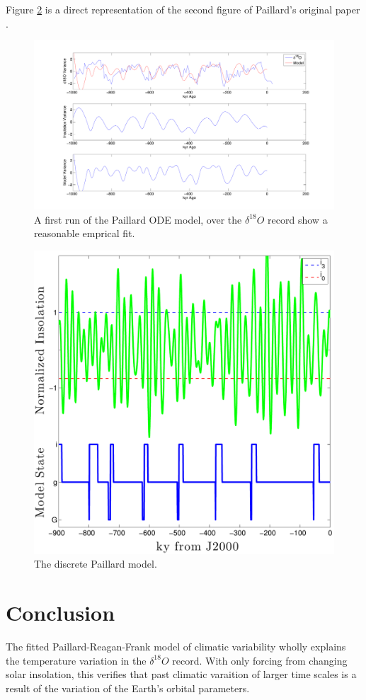 Figure \ref{fig:paillard-fig3} is a direct representation of the second figure of Paillard's original paper \cite{paillard1998timing}.

\begin{figure}[tpb!]
\centering
  \includegraphics[width=.53\textwidth]{paillardFig3.pdf}
  \caption{
    A first run of the Paillard ODE model, over the $\delta ^{18} O$ record show a reasonable emprical fit.
  }
  \label{fig:paillard-fig3}
\end{figure}

\begin{figure}[tpb!]
\centering
  \includegraphics[width=.45\textwidth]{../src/discrete_plot_noname.pdf}
  \caption{
    The discrete Paillard model.
  }
  \label{fig:paillard-fig3}
\end{figure}


\section{Conclusion}

The fitted Paillard-Reagan-Frank model of climatic variability wholly explains the temperature variation in the $\delta ^{18} O$ record.
With only forcing from changing solar insolation, this verifies that past climatic varaition of larger time scales is a result of the variation of the Earth's orbital parameters.


